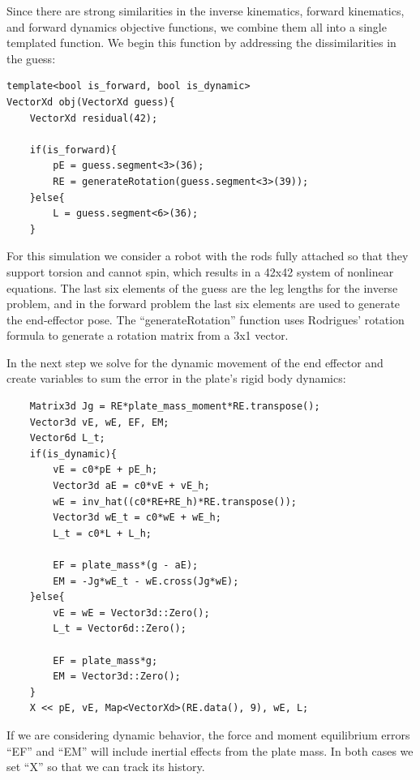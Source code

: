 \documentclass[12pt]{article}
\begin{document}
Since there are strong similarities in the inverse kinematics, forward kinematics, and forward dynamics objective functions, we combine them all into a single templated function. We begin this function by addressing the dissimilarities in the guess:
\begin{lstlisting}
template<bool is_forward, bool is_dynamic>
VectorXd obj(VectorXd guess){
    VectorXd residual(42);

    if(is_forward){
        pE = guess.segment<3>(36);
        RE = generateRotation(guess.segment<3>(39));
    }else{
        L = guess.segment<6>(36);
    }
\end{lstlisting}
For this simulation we consider a robot with the rods fully attached so that they support torsion and cannot spin, which results in a 42x42 system of nonlinear equations. The last six elements of the guess are the leg lengths for the inverse problem, and in the forward problem the last six elements are used to generate the end-effector pose. The ``generateRotation'' function uses Rodrigues' rotation formula to generate a rotation matrix from a 3x1 vector.

In the next step we solve for the dynamic movement of the end effector and create variables to sum the error in the plate's rigid body dynamics:
\begin{lstlisting}
    Matrix3d Jg = RE*plate_mass_moment*RE.transpose();
    Vector3d vE, wE, EF, EM;
    Vector6d L_t;
    if(is_dynamic){
        vE = c0*pE + pE_h;
        Vector3d aE = c0*vE + vE_h;
        wE = inv_hat((c0*RE+RE_h)*RE.transpose());
        Vector3d wE_t = c0*wE + wE_h;
        L_t = c0*L + L_h;

        EF = plate_mass*(g - aE);
        EM = -Jg*wE_t - wE.cross(Jg*wE);
    }else{
        vE = wE = Vector3d::Zero();
        L_t = Vector6d::Zero();

        EF = plate_mass*g;
        EM = Vector3d::Zero();
    }
    X << pE, vE, Map<VectorXd>(RE.data(), 9), wE, L;
\end{lstlisting}
If we are considering dynamic behavior, the force and moment equilibrium errors ``EF'' and ``EM'' will include inertial effects from the plate mass. In both cases we set ``X'' so that we can track its history.
\end{document}
